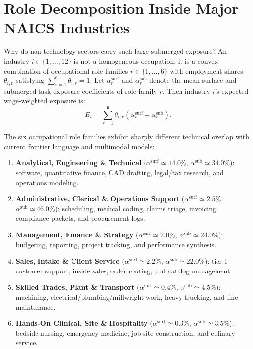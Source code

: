 \documentclass[11pt]{article}
\begin{document}
\section{Role Decomposition Inside Major NAICS Industries}
\label{sec:role-matrix}
Why do non-technology sectors carry such large submerged exposure? An industry $i \in \{1,\dots,12\}$ is not a homogeneous occupation; it is a convex combination of occupational role families $r \in \{1,\dots,6\}$ with employment shares $\theta_{i,r}$ satisfying $\sum_{r=1}^6 \theta_{i,r} = 1$. Let $\alpha_r^{\text{surf}}$ and $\alpha_r^{\text{sub}}$ denote the mean surface and submerged task-exposure coefficients of role family $r$. Then industry $i$'s expected wage-weighted exposure is:
\begin{equation}
E_i = \sum_{r=1}^{6} \theta_{i,r}\left(\alpha_r^{\text{surf}} + \alpha_r^{\text{sub}}\right).
\label{eq:sector-exposure}
\end{equation}

The six occupational role families exhibit sharply different technical overlap with current frontier language and multimodal models:
\begin{enumerate}[label=\arabic*.]
\item \textbf{Analytical, Engineering \& Technical} ($\alpha^{\text{surf}} \simeq 14.0\%$, $\alpha^{\text{sub}} \simeq 34.0\%$): software, quantitative finance, CAD drafting, legal/tax research, and operations modeling.
\item \textbf{Administrative, Clerical \& Operations Support} ($\alpha^{\text{surf}} \simeq 2.5\%$, $\alpha^{\text{sub}} \simeq 46.0\%$): scheduling, medical coding, claims triage, invoicing, compliance packets, and procurement logs.
\item \textbf{Management, Finance \& Strategy} ($\alpha^{\text{surf}} \simeq 2.0\%$, $\alpha^{\text{sub}} \simeq 24.0\%$): budgeting, reporting, project tracking, and performance synthesis.
\item \textbf{Sales, Intake \& Client Service} ($\alpha^{\text{surf}} \simeq 2.2\%$, $\alpha^{\text{sub}} \simeq 22.0\%$): tier-1 customer support, inside sales, order routing, and catalog management.
\item \textbf{Skilled Trades, Plant \& Transport} ($\alpha^{\text{surf}} \simeq 0.4\%$, $\alpha^{\text{sub}} \simeq 4.5\%$): machining, electrical/plumbing/millwright work, heavy trucking, and line maintenance.
\item \textbf{Hands-On Clinical, Site \& Hospitality} ($\alpha^{\text{surf}} \simeq 0.3\%$, $\alpha^{\text{sub}} \simeq 3.5\%$): bedside nursing, emergency medicine, job-site construction, and culinary service.
\end{enumerate}
\end{document}
